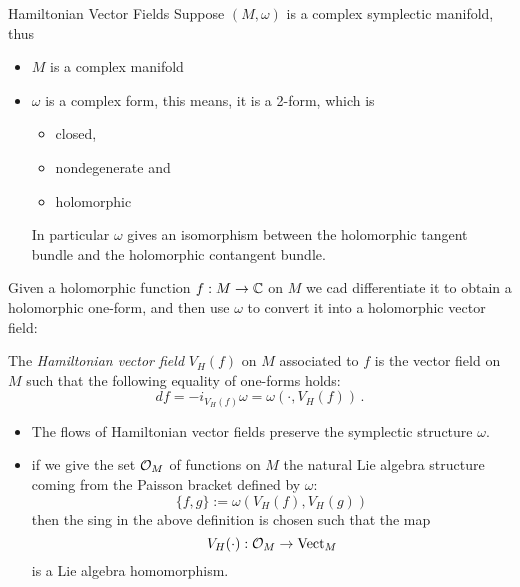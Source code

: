 \begin{frame}[t]{Hamiltonian Vector Fields}
  Suppose $(M,\omega)$ is a complex symplectic manifold, thus
  \begin{itemize}
    \item $M$ is a complex manifold
    \item $\omega$ is a complex form, this means, it is a 2-form, which is
      \begin{itemize}
        \item closed,
        \item nondegenerate and
        \item holomorphic
      \end{itemize}
      In particular $\omega$ gives an isomorphism between the holomorphic
      tangent bundle and the holomorphic contangent bundle.
  \end{itemize}
  Given a holomorphic function $f:M\to\mathbb{C}$ on $M$ we cad differentiate it to
  obtain a holomorphic one-form, and then use $\omega$ to convert it into a
  holomorphic vector field:
  \begin{defn}
    The \emph{Hamiltonian vector field} $V_H(f)$ on $M$ associated to $f$ is
    the vector field on $M$ such that the following equality of one-forms
    holds:
    \[
      df=-i_{V_H(f)}\omega=\omega(\cdot,V_H(f)) \,.
    \]
  \end{defn}
  \begin{itemize}
    \item The flows of Hamiltonian vector fields preserve the symplectic
      structure $\omega$.
    \item if we give the set $\mathcal{O}_M$ of functions on $M$ the natural Lie
      algebra structure coming from the Paisson bracket defined by $\omega$:
      \[
        \{f,g\}:=\omega(V_H(f),V_H(g))
      \]
      then the sing in the above definition is chosen such that the map
      \[
        V_H(\cdot):\mathcal{O}_M\to\operatorname{Vect}_M
      \]
      is a Lie algebra homomorphism.
  \end{itemize}
\end{frame}

